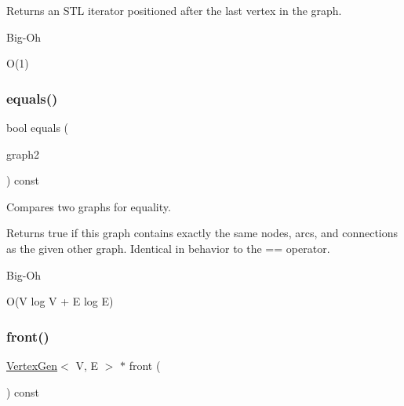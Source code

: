 Returns an S\+TL iterator positioned after the last vertex in the graph. 

\begin{DoxyRefDesc}{Big-\/\+Oh}
\item[\mbox{\hyperlink{BigOh__BigOh000092}{Big-\/\+Oh}}]O(1) \end{DoxyRefDesc}
\mbox{\label{classGraph_a6bec43eb3dfdf3d23eb328b406edf44a}} 
\subsubsection{\texorpdfstring{equals()}{equals()}}
{\footnotesize\ttfamily bool equals (\begin{DoxyParamCaption}\item[{const \mbox{\hyperlink{classGraph}{Graph}}$<$ \mbox{\hyperlink{classVertexGen}{Vertex\+Gen}}$<$ V, E $>$ , Edge\+Gen$<$ V, E $>$  $>$ \&}]{graph2 }\end{DoxyParamCaption}) const\hspace{0.3cm}{\ttfamily [inherited]}}



Compares two graphs for equality. 

Returns {\ttfamily true} if this graph contains exactly the same nodes, arcs, and connections as the given other graph. Identical in behavior to the == operator. \begin{DoxyRefDesc}{Big-\/\+Oh}
\item[\mbox{\hyperlink{BigOh__BigOh000058}{Big-\/\+Oh}}]O(V log V + E log E) \end{DoxyRefDesc}
\mbox{\label{classGraph_a7b7c2c1738f8e7faf84c54d7642992fa}} 
\subsubsection{\texorpdfstring{front()}{front()}}
{\footnotesize\ttfamily \mbox{\hyperlink{classVertexGen}{Vertex\+Gen}}$<$ V, E $>$  $\ast$ front (\begin{DoxyParamCaption}{ }\end{DoxyParamCaption}) const\hspace{0.3cm}{\ttfamily [inherited]}}



